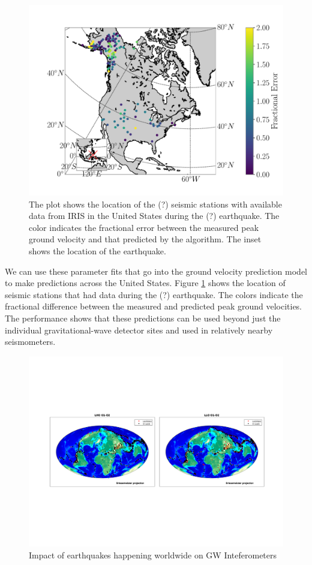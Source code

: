 \documentclass[preprint, aps, showpacs]{revtex4-1}
\newcommand{\rednote}[1]{{\color{red} (#1)}}
\begin{document}
\begin{figure}[t]
\hspace*{-0.5cm}
 \includegraphics[width=5.0in]{maps_vel_pred_vs_measured.pdf}
 \caption{The plot shows the location of the \rednote{?} seismic stations with available data from IRIS in the United States during the \rednote{?} earthquake. The color indicates the fractional error between the measured peak ground velocity and that predicted by the algorithm. The inset shows the location of the earthquake.}
 \label{fig:map}
\end{figure}

We can use these parameter fits that go into the ground velocity prediction model to make predictions across the United States.
Figure \ref{fig:map} shows the location of seismic stations that had data during the \rednote{?} earthquake. The colors indicate the fractional difference between the measured and predicted peak ground velocities.  
The performance shows that these predictions can be used beyond just the individual gravitational-wave detector sites and used in relatively nearby seismometers.

\begin{figure}[!htb]
\hspace*{-0.5cm}
 \includegraphics[width=\textwidth]{./plots/EQ_Distribution.pdf}
 \caption{Impact of earthquakes happening worldwide on GW Inteferometers}
 \label{fig:lockloss_distribution}
\end{figure}
\end{document}
